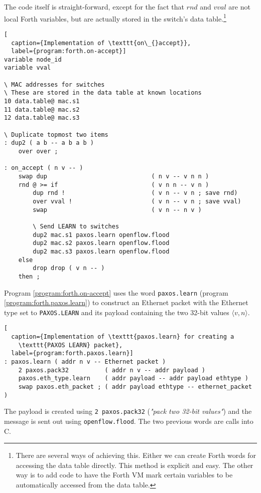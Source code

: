 The code itself is straight-forward, except for the fact that $rnd$ and
$vval$ are not local Forth variables, but are actually stored in the
switch's data table.\footnote{There are several ways of achieving this.
Either we can create Forth words for accessing the data table directly.
This method is explicit and easy.  The other way is to add code to have
the Forth VM mark certain variables to be automatically accessed from the
data table.}

\begin{lstlisting}[
  caption={Implementation of \texttt{on\_{}accept}},
  label={program:forth.on-accept}]
variable node_id
variable vval

\ MAC addresses for switches
\ These are stored in the data table at known locations
10 data.table@ mac.s1
11 data.table@ mac.s2
12 data.table@ mac.s3

\ Duplicate topmost two items
: dup2 ( a b -- a b a b )
    over over ;

: on_accept ( n v -- )
    swap dup                             ( n v -- v n n )
    rnd @ >= if                          ( v n n -- v n )
        dup rnd !                        ( v n -- v n ; save rnd)
        over vval !                      ( v n -- v n ; save vval)
        swap                             ( v n -- n v )

        \ Send LEARN to switches
        dup2 mac.s1 paxos.learn openflow.flood
        dup2 mac.s2 paxos.learn openflow.flood
        dup2 mac.s3 paxos.learn openflow.flood
    else
        drop drop ( v n -- )
    then ;
\end{lstlisting}

Program \ref{program:forth.on-accept} 
uses the word \texttt{paxos.learn} (program \ref{program:forth.paxos.learn})
to construct an Ethernet packet with the
Ethernet type set to \texttt{PAXOS.LEARN} and its payload containing the two
32-bit values $\langle v, n \rangle$.

\begin{lstlisting}[
  caption={Implementation of \texttt{paxos.learn} for creating a
    \texttt{PAXOS LEARN} packet},
  label={program:forth.paxos.learn}]
: paxos.learn ( addr n v -- Ethernet packet )
    2 paxos.pack32          ( addr n v -- addr payload )
    paxos.eth_type.learn    ( addr payload -- addr payload ethtype )
    swap paxos.eth_packet ; ( addr payload ethtype -- ethernet_packet )
\end{lstlisting}

The payload is created using
\texttt{2 paxos.pack32} (\textit{"pack two 32-bit values"}) and the message
is sent out using \texttt{openflow.flood}.  The two previous words are calls
into C.

